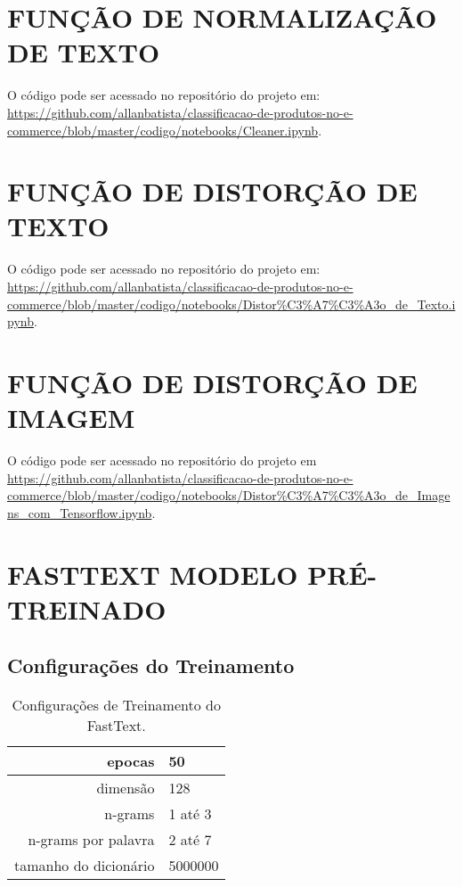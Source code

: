 \begin{apendicesenv}

\partapendices
\clearpage
\clearpage

\chapter{FUNÇÃO DE NORMALIZAÇÃO DE TEXTO}
\label{chap:funcao_normalizacao_texto}

O código pode ser acessado no repositório do projeto em:
\url{https://github.com/allanbatista/classificacao-de-produtos-no-e-commerce/blob/master/codigo/notebooks/Cleaner.ipynb}.


\chapter{FUNÇÃO DE DISTORÇÃO DE TEXTO}
\label{chap:funcao_distorcao_texto}

O código pode ser acessado no repositório do projeto em:
\url{https://github.com/allanbatista/classificacao-de-produtos-no-e-commerce/blob/master/codigo/notebooks/Distor\%C3\%A7\%C3\%A3o_de_Texto.ipynb}.

\clearpage
\chapter{FUNÇÃO DE DISTORÇÃO DE IMAGEM}
\label{chap:funcao_distorcao_imagem}

O código pode ser acessado no repositório do projeto em 
\url{https://github.com/allanbatista/classificacao-de-produtos-no-e-commerce/blob/master/codigo/notebooks/Distor\%C3\%A7\%C3\%A3o_de_Imagens_com_Tensorflow.ipynb}.

\chapter{FASTTEXT MODELO PRÉ-TREINADO}
\label{chap:fasttext_modelo_pretreinado}


\section{Configurações do Treinamento}

\begin{table}[htb]
    \ABNTEXfontereduzida
    \centering
    \caption[Configurações de Treinamento do FastText]{Configurações de Treinamento do FastText.}
    \begin{tabular}{|r|l|} \hline
        epocas & 50 \\ \hline
        dimensão & 128 \\ \hline
        n-grams & 1 até 3 \\ \hline
        n-grams por palavra & 2 até 7 \\ \hline
        tamanho do dicionário & 5000000 \\ \hline
    \end{tabular}
    \label{tab:fasttext_configuracores}
\end{table}


\end{apendicesenv}
